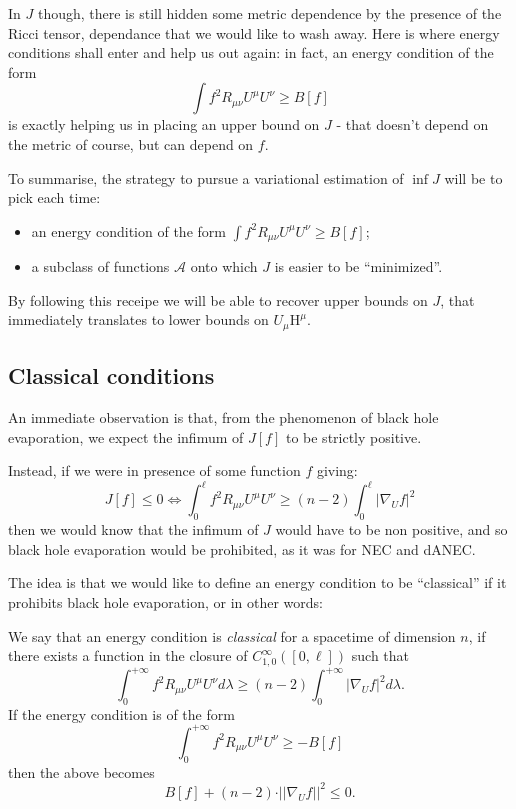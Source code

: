 	In \(J\) though, there is still hidden some metric dependence by the presence of the Ricci tensor, dependance that we would like to wash away. Here is where energy conditions shall enter and help us out again: in fact, an energy condition of the form 
	\[
	\int f^2 R_{\mu\nu}U^{\mu}U^{\nu} \ge B[f]	
	\]
	is exactly helping us in placing an upper bound on \(J\) - that doesn't depend on the metric of course, but can depend on \(f\).

	To summarise, the strategy to pursue a variational estimation of \(\inf J\) will be to pick each time:
	\begin{itemize}
		\item[\ding{99}] an energy condition of the form \(\int f^2 R_{\mu\nu}U^{\mu}U^{\nu} \ge B[f]\);
		\item[\ding{99}] a subclass of functions \(\mathcal{A}\) onto which \(J\) is easier to be ``minimized''.
	\end{itemize}
	By following this receipe we will be able to recover upper bounds on \(J\), that immediately translates to lower bounds on \(U_{\mu}\mathrm{H}^{\mu}\).

	\subsection{Classical conditions}
	An immediate observation is that, from the phenomenon of black hole evaporation, we expect the infimum of \(J[f]\) to be strictly positive.

	Instead, if we were in presence of some function \(f\) giving:
	\[
	J[f] \le 0	\iff \int_0^{\ell} f^2 R_{\mu\nu}U^{\mu}U^{\nu} \ge (n - 2)\int_0^{\ell} \vert \nabla_U f\vert^2
	\]
	then we would know that the infimum of \(J\) would have to be non positive, and so black hole evaporation would be prohibited, as it was for NEC and dANEC.

	The idea is that we would like to define an energy condition to be ``classical'' if it prohibits black hole evaporation, or in other words:
	\begin{definition}
		\label{def:classical-energy-condition}
		We say that an energy condition is \emph{classical} for a spacetime of dimension \(n\), if there exists a function in the closure of \(C_{1,0}^{\infty}\left([0, \ell]\right)\) such that
		\[
			\int_0^{+\infty} f^2 R_{\mu\nu}U^{\mu}U^{\nu} d\lambda\ge (n - 2) \int_0^{+\infty} \vert \nabla_U f\vert^2 d\lambda.	
		\]
		If the energy condition is of the form
		\[
			\int_0^{+\infty} f^2 R_{\mu\nu}U^{\mu}U^{\nu} \ge -B[f]	
		\]
		then the above becomes
		\begin{equation}
			\label{eq:definition-classical-condition}
			B[f] + (n - 2) \cdot \vert\vert \nabla_U f \vert\vert^2 \le 0.
		\end{equation}
	\end{definition}


